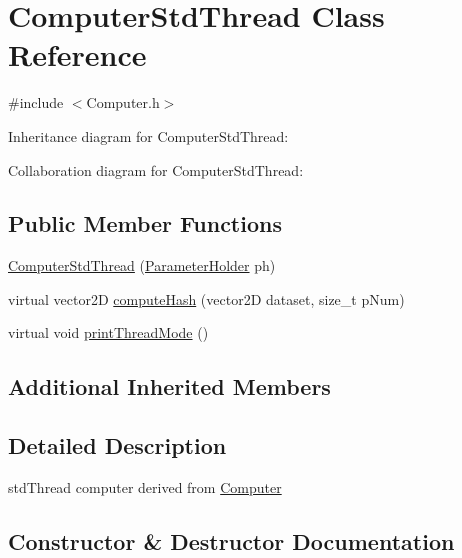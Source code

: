 \hypertarget{classComputerStdThread}{}\section{Computer\+Std\+Thread Class Reference}
\label{classComputerStdThread}


{\ttfamily \#include $<$Computer.\+h$>$}



Inheritance diagram for Computer\+Std\+Thread\+:


Collaboration diagram for Computer\+Std\+Thread\+:
\subsection*{Public Member Functions}
\begin{DoxyCompactItemize}
\item 
\hyperlink{classComputerStdThread_aaefd1bfd51b1f014bba22076e985d25a}{Computer\+Std\+Thread} (\hyperlink{structParameterHolder}{Parameter\+Holder} ph)
\item 
virtual vector2D \hyperlink{classComputerStdThread_a1c47a2c0ea24162a4d9369eced404a19}{compute\+Hash} (vector2D dataset, size\+\_\+t p\+Num)
\item 
virtual void \hyperlink{classComputerStdThread_a129300437bc5a184b2441b8eede7e837}{print\+Thread\+Mode} ()
\end{DoxyCompactItemize}
\subsection*{Additional Inherited Members}


\subsection{Detailed Description}
std\+Thread computer derived from \hyperlink{classComputer}{Computer} 

\subsection{Constructor \& Destructor Documentation}
